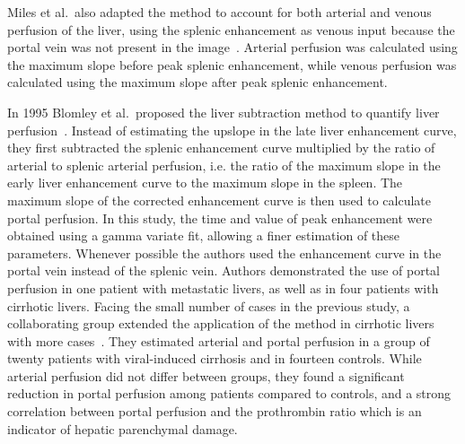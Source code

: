 Miles et al.~also adapted the method to account for both arterial and venous perfusion of the liver, using the splenic enhancement as venous input because the portal vein was not present in the image~\cite{Miles:1993cq}.
Arterial perfusion was calculated using the maximum slope before peak splenic enhancement, while venous perfusion was calculated using the maximum slope after peak splenic enhancement.

In 1995 Blomley et al.~proposed the liver subtraction method to quantify liver perfusion~\cite{Blomley:1995vs}. 
Instead of estimating the upslope in the late liver enhancement curve, they first subtracted the splenic enhancement curve multiplied by the ratio of arterial to splenic arterial perfusion, i.e. the ratio of the maximum slope in the early liver enhancement curve to the maximum slope in the spleen. 
The maximum slope of the corrected enhancement curve is then used to calculate portal perfusion.
In this study, the time and value of peak enhancement were obtained using a gamma variate fit, allowing a finer estimation of these parameters.
Whenever possible the authors used the enhancement curve in the portal vein instead of the splenic vein.
Authors demonstrated the use of portal perfusion in one patient with metastatic livers, as well as in four patients with cirrhotic livers.
Facing the small number of cases in the previous study, a collaborating group extended the application of the method in cirrhotic livers with more cases~\cite{Tsushima:1999vc}.
They estimated arterial and portal perfusion in a group of twenty patients with viral-induced cirrhosis and in fourteen controls. 
While arterial perfusion did not differ between groups, they found a significant reduction in portal perfusion among patients compared to controls, and a strong correlation between portal perfusion and the prothrombin ratio which is an indicator of hepatic parenchymal damage.

